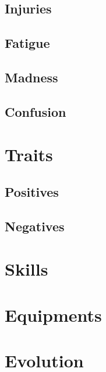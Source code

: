 \documentclass[11pt]{article}
\begin{document}
\begin{multicols}{2}
\lipsum[1]

\subsection{Injuries}

\lipsum[1]

\subsection{Fatigue}

\lipsum[1]

\subsection{Madness}

\lipsum[1]

\subsection{Confusion}

\lipsum[1]

\section{Traits}

\lipsum[1]

\subsection{Positives}

\lipsum[1]

\subsection{Negatives}

\lipsum[1-2]

\section{Skills}

\lipsum[1]

\section{Equipments}

\lipsum[1]

\section{Evolution}


\end{multicols}
\end{document}
